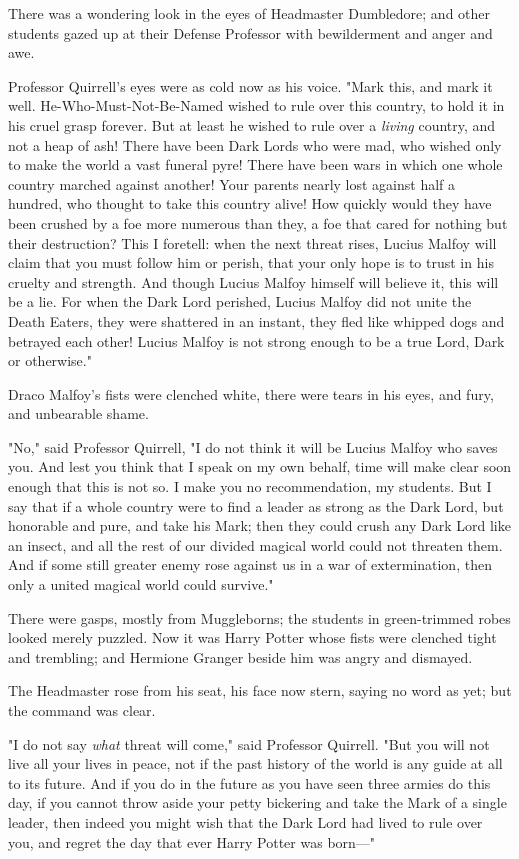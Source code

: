 There was a wondering look in the eyes of Headmaster Dumbledore; and other
students gazed up at their Defense Professor with bewilderment and anger and
awe.

Professor Quirrell's eyes were as cold now as his voice. "Mark this, and mark
it well. He-Who-Must-Not-Be-Named wished to rule over this country, to hold it
in his cruel grasp forever. But at least he wished to rule over a \emph{living}
country, and not a heap of ash! There have been Dark Lords who were mad, who
wished only to make the world a vast funeral pyre! There have been wars in
which one whole country marched against another! Your parents nearly lost
against half a hundred, who thought to take this country alive! How quickly
would they have been crushed by a foe more numerous than they, a foe that cared
for nothing but their destruction? This I foretell: when the next threat rises,
Lucius Malfoy will claim that you must follow him or perish, that your only
hope is to trust in his cruelty and strength. And though Lucius Malfoy himself
will believe it, this will be a lie. For when the Dark Lord perished, Lucius
Malfoy did not unite the Death Eaters, they were shattered in an instant, they
fled like whipped dogs and betrayed each other! Lucius Malfoy is not strong
enough to be a true Lord, Dark or otherwise."

Draco Malfoy's fists were clenched white, there were tears in his eyes, and
fury, and unbearable shame.

"No," said Professor Quirrell, "I do not think it will be Lucius Malfoy who
saves you. And lest you think that I speak on my own behalf, time will make
clear soon enough that this is not so. I make you no recommendation, my
students. But I say that if a whole country were to find a leader as strong as
the Dark Lord, but honorable and pure, and take his Mark; then they could crush
any Dark Lord like an insect, and all the rest of our divided magical world
could not threaten them. And if some still greater enemy rose against us in a
war of extermination, then only a united magical world could survive."

There were gasps, mostly from Muggleborns; the students in green-trimmed robes
looked merely puzzled. Now it was Harry Potter whose fists were clenched tight
and trembling; and Hermione Granger beside him was angry and dismayed.

The Headmaster rose from his seat, his face now stern, saying no word as yet;
but the command was clear.

"I do not say \emph{what} threat will come," said Professor Quirrell. "But you
will not live all your lives in peace, not if the past history of the world is
any guide at all to its future. And if you do in the future as you have seen
three armies do this day, if you cannot throw aside your petty bickering and
take the Mark of a single leader, then indeed you might wish that the Dark Lord
had lived to rule over you, and regret the day that ever Harry Potter was
born---"

